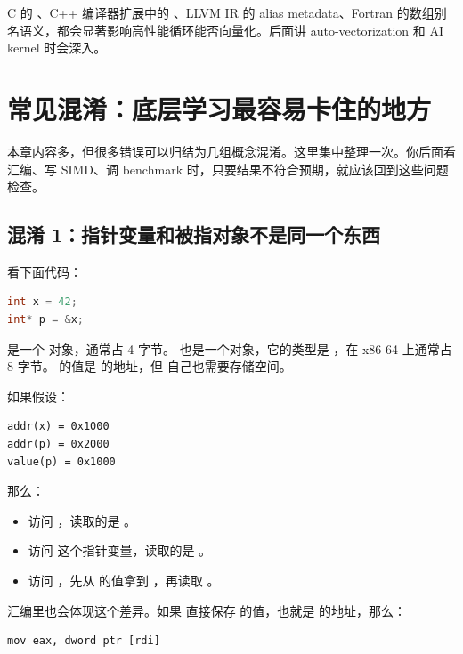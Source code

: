 \begin{deepdive}
C 的 、C++ 编译器扩展中的 、LLVM IR 的 alias metadata、Fortran 的数组别名语义，都会显著影响高性能循环能否向量化。后面讲 auto-vectorization 和 AI kernel 时会深入。
\end{deepdive}

\section{常见混淆：底层学习最容易卡住的地方}

本章内容多，但很多错误可以归结为几组概念混淆。这里集中整理一次。你后面看汇编、写 SIMD、调 benchmark 时，只要结果不符合预期，就应该回到这些问题检查。

\subsection{混淆 1：指针变量和被指对象不是同一个东西}

看下面代码：

\begin{lstlisting}[language=C++]
int x = 42;
int* p = &x;
\end{lstlisting}

 是一个  对象，通常占 4 字节。 也是一个对象，它的类型是 ，在 x86-64 上通常占 8 字节。 的值是  的地址，但  自己也需要存储空间。

如果假设：

\begin{lstlisting}
addr(x) = 0x1000
addr(p) = 0x2000
value(p) = 0x1000
\end{lstlisting}

那么：

\begin{itemize}
  \item 访问 ，读取的是 。
  \item 访问  这个指针变量，读取的是 。
  \item 访问 ，先从  的值拿到 ，再读取 。
\end{itemize}

汇编里也会体现这个差异。如果  直接保存  的值，也就是  的地址，那么：

\begin{lstlisting}
mov eax, dword ptr [rdi]
\end{lstlisting}

